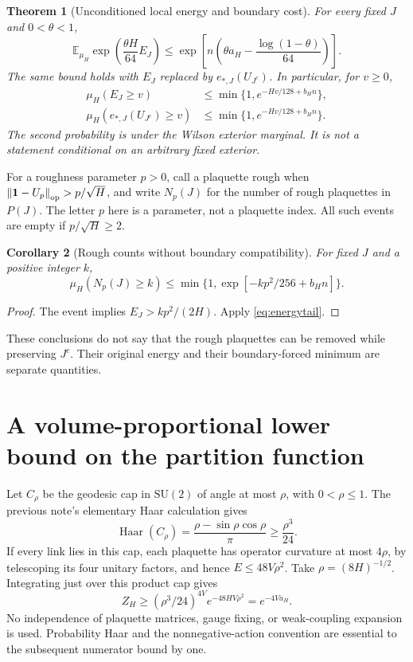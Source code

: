 \documentclass[11pt]{article}
\newtheorem{theorem}{Theorem}[section]
\newtheorem{corollary}[theorem]{Corollary}
\theoremstyle{remark}
\newcommand{\one}{\mathbf 1}
\newcommand{\E}{\mathbb E}
\newcommand{\SU}{\mathrm{SU}(2)}
\newcommand{\norm}[1]{\left\lVert#1\right\rVert}
\begin{document}
\begin{theorem}[Unconditioned local energy and boundary cost]
\label{thm:moment}
For every fixed $J$ and $0<\theta<1$,
\begin{equation}
 \E_{\mu_H}\exp\!\left(\frac{\theta H}{64}E_J\right)
 \le \exp\!\left[n\left(\theta a_H-
                  \frac{\log(1-\theta)}{64}\right)\right].
 \label{eq:moment}
\end{equation}
The same bound holds with $E_J$ replaced by
$e_{*,J}(U_{J^c})$. In particular, for $v\ge0$,
\begin{align}
 \mu_H(E_J\ge v)&\le\min\{1,e^{-Hv/128+b_Hn}\},\label{eq:energytail}\\
 \mu_H(e_{*,J}(U_{J^c})\ge v)
 &\le\min\{1,e^{-Hv/128+b_Hn}\}.\label{eq:mintail}
\end{align}
The second probability is under the Wilson \emph{exterior marginal}.
It is not a statement conditional on an arbitrary fixed exterior.
\end{theorem}

For a roughness parameter $p>0$, call a plaquette rough when
$\norm{\one-U_p}_{\rm op}>p/\sqrt H$, and write $N_p(J)$ for the number
of rough plaquettes in $P(J)$. The letter $p$ here is a parameter, not a
plaquette index. All such events are empty if $p/\sqrt H\ge2$.

\begin{corollary}[Rough counts without boundary compatibility]
\label{cor:rough}
For fixed $J$ and a positive integer $k$,
\begin{equation}
 \mu_H(N_p(J)\ge k)
 \le\min\{1,\exp[-kp^2/256+b_Hn]\}.
 \label{eq:rough}
\end{equation}
\end{corollary}
\begin{proof}
The event implies $E_J>kp^2/(2H)$. Apply \eqref{eq:energytail}.
\end{proof}
These conclusions do not say that the rough plaquettes can be removed
while preserving $J^c$. Their original energy and their boundary-forced
minimum are separate quantities.

\section{A volume-proportional lower bound on the partition function}
Let $C_\rho$ be the geodesic cap in $\SU$ of angle at most $\rho$, with
$0<\rho\le1$. The previous note's elementary Haar calculation gives
\[
 \operatorname{Haar}(C_\rho)
 =\frac{\rho-\sin\rho\cos\rho}{\pi}\ge\frac{\rho^3}{24}.
\]
If every link lies in this cap, each plaquette has operator curvature at
most $4\rho$, by telescoping its four unitary factors, and hence
$E\le48V\rho^2$. Take $\rho=(8H)^{-1/2}$. Integrating just over this
product cap gives
\begin{equation}
 Z_H\ge(\rho^3/24)^{4V}e^{-48HV\rho^2}
       =e^{-4Va_H}.
 \label{eq:partition}
\end{equation}
No independence of plaquette matrices, gauge fixing, or weak-coupling
expansion is used. Probability Haar and the nonnegative-action convention
are essential to the subsequent numerator bound by one.
\end{document}
